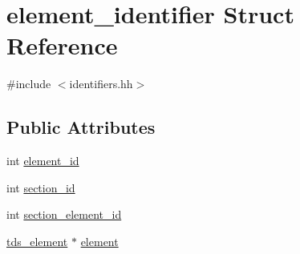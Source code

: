 \hypertarget{structelement__identifier}{\section{element\-\_\-identifier Struct Reference}
\label{structelement__identifier}
}


{\ttfamily \#include $<$identifiers.\-hh$>$}

\subsection*{Public Attributes}
\begin{DoxyCompactItemize}
\item 
int \hyperlink{structelement__identifier_a177cd08fd67204a84c9ab045cbbef706}{element\-\_\-id}
\item 
int \hyperlink{structelement__identifier_a28ecafe70b469746ec1a4e2d58511637}{section\-\_\-id}
\item 
int \hyperlink{structelement__identifier_a8f54674a7794f520435a7c9cc13057e9}{section\-\_\-element\-\_\-id}
\item 
\hyperlink{classtds__element}{tds\-\_\-element} $\ast$ \hyperlink{structelement__identifier_a0c60a4998b53560e3be639cbda2c51d0}{element}
\end{DoxyCompactItemize}


